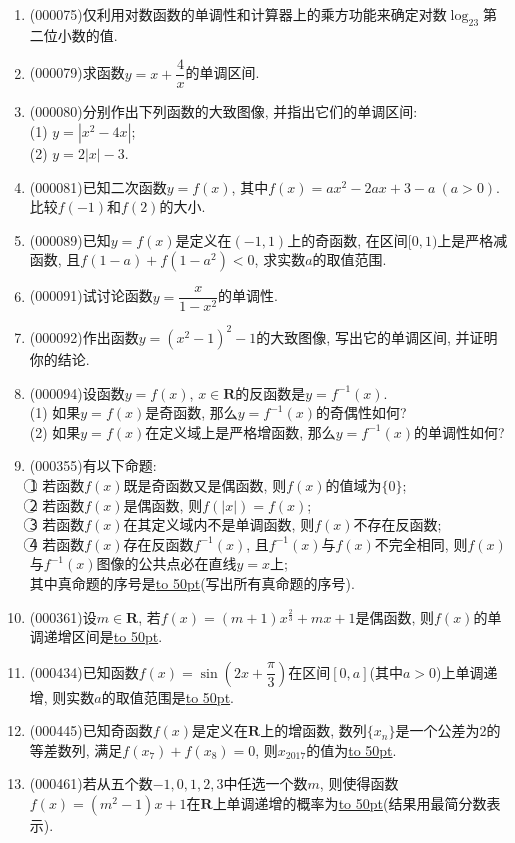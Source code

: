 \documentclass[10pt,a4paper]{article}
\newcommand{\blank}[1]{\underline{\hbox to #1pt{}}}
\begin{document}
\begin{enumerate}[1.]
\item {\tiny (000075)}仅利用对数函数的单调性和计算器上的乘方功能来确定对数$\log_23$第二位小数的值.
\item {\tiny (000079)}求函数$y=x+\dfrac 4x$的单调区间.
\item {\tiny (000080)}分别作出下列函数的大致图像, 并指出它们的单调区间:\\
(1) $y=|x^2-4x|$;\\
(2) $y=2|x|-3$.
\item {\tiny (000081)}已知二次函数$y=f(x)$, 其中$f(x)=ax^2-2ax+3-a \ (a>0)$. 比较$f(-1)$和$f(2)$的大小.
\item {\tiny (000089)}已知$y=f(x)$是定义在$(-1, 1)$上的奇函数, 在区间$[0, 1)$上是严格减函数, 且$f(1-a)+f(1-a^2)<0$, 求实数$a$的取值范围.
\item {\tiny (000091)}试讨论函数$y=\dfrac{x}{1-x^2}$的单调性.
\item {\tiny (000092)}作出函数$y=(x^2-1)^2-1$的大致图像, 写出它的单调区间, 并证明你的结论.
\item {\tiny (000094)}设函数$y=f(x)$, $x\in \mathbf{R}$的反函数是$y=f^{-1}(x)$.\\
(1) 如果$y=f(x)$是奇函数, 那么$y=f^{-1}(x)$的奇偶性如何?\\
(2) 如果$y=f(x)$在定义域上是严格增函数, 那么$y=f^{-1}(x)$的单调性如何?
\item {\tiny (000355)}有以下命题:\\
\textcircled{1} 若函数$f(x)$既是奇函数又是偶函数, 则$f(x)$的值域为$\{0\}$; \\
\textcircled{2} 若函数$f(x)$是偶函数, 则$f(|x|)=f(x)$;\\
\textcircled{3} 若函数$f(x)$在其定义域内不是单调函数, 则$f(x)$不存在反函数;\\
\textcircled{4} 若函数$f(x)$存在反函数${{f}^{-1}}(x)$, 且${{f}^{-1}}(x)$与$f(x)$不完全相同, 则$f(x)$与${{f}^{-1}}(x)$图像的公共点必在直线$y=x$上; \\
其中真命题的序号是\blank{50}(写出所有真命题的序号).
\item {\tiny (000361)}设$m\in \mathbf{R}$, 若$f(x)=(m+1)x^{\tfrac{2}{3}}+mx+1$是偶函数, 则$f(x)$的单调递增区间是\blank{50}.
\item {\tiny (000434)}已知函数$f(x)=\sin (2x+\dfrac\pi 3)$在区间$[0,a]$(其中$a>0$)上单调递增, 则实数$a$的取值范围是\blank{50}.
\item {\tiny (000445)}已知奇函数$f(x)$是定义在$\mathbf{R}$上的增函数, 数列$\{x_n\}$是一个公差为$2$的等差数列, 满足$f(x_7)+f(x_8)=0$, 则$x_{2017}$的值为\blank{50}.
\item {\tiny (000461)}若从五个数$-1,0,1,2,3$中任选一个数$m$, 则使得函数$f(x)=(m^2-1)x+1$在$\mathbf{R}$上单调递增的概率为\blank{50}(结果用最简分数表示).

\end{enumerate}
\end{document}
